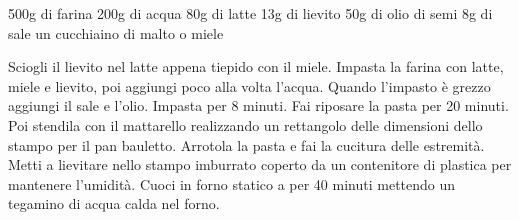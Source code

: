 \begin{ingreds}
	500g di farina
	200g di acqua
	80g di latte
	13g di lievito
	50g di olio di semi
	8g di sale
	un cucchiaino di malto o miele



\end{ingreds}

\begin{method}
Sciogli il lievito nel latte appena tiepido con il miele. Impasta la farina con latte, miele e lievito, poi aggiungi poco alla volta l'acqua. Quando l'impasto è grezzo aggiungi il sale e l'olio. Impasta per 8 minuti. Fai riposare la pasta per 20 minuti. Poi stendila con il mattarello realizzando un rettangolo delle dimensioni dello stampo per il pan bauletto. Arrotola la pasta e fai la cucitura delle estremità. Metti a lievitare nello stampo imburrato coperto da un contenitore di plastica per mantenere l'umidità.
Cuoci in forno statico a  per 40 minuti mettendo un tegamino di acqua calda nel forno.


\end{method}




